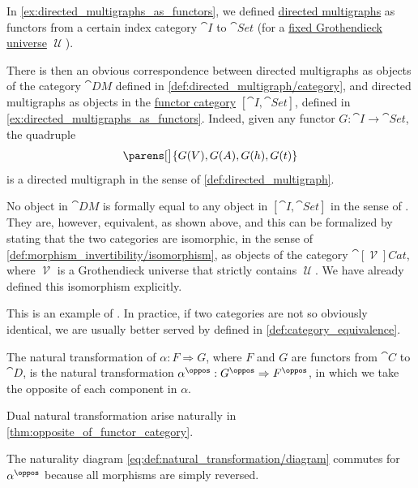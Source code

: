 \begin{example}\label{ex:isomorphism_of_directed_multigraph_categories}
  In \cref{ex:directed_multigraphs_as_functors}, we defined \hyperref[def:directed_multigraph]{directed multigraphs} as functors from a certain index category \( \cat{I} \) to \( \cat{Set} \) (for a \hyperref[def:small_category]{fixed Grothendieck universe} \( \mscrU \)).

  There is then an obvious correspondence between directed multigraphs as objects of the category \( \cat{DM} \) defined in \cref{def:directed_multigraph/category}, and directed multigraphs as objects in the \hyperref[def:functor_category]{functor category} \( [\cat{I}, \cat{Set}] \), defined in \cref{ex:directed_multigraphs_as_functors}. Indeed, given any functor \( G: \cat{I} \to \cat{Set} \), the quadruple
  \begin{equation*}
    \parens[\big]{ G(V), G(A), G(h), G(t) }
  \end{equation*}
  is a directed multigraph in the sense of \cref{def:directed_multigraph}.

  No object in \( \cat{DM} \) is formally equal to any object in \( [\cat{I}, \cat{Set}] \) in the sense of \hyperref[def:zfc]{}. They are, however, equivalent, as shown above, and this can be formalized by stating that the two categories are isomorphic, in the sense of \cref{def:morphism_invertibility/isomorphism}, as objects of the category \( \cat[\mscrV]{Cat} \), where \( \mscrV \) is a Grothendieck universe that strictly contains \( \mscrU \). We have already defined this isomorphism explicitly.

  This is an example of . In practice, if two categories are not so obviously identical, we are usually better served by  defined in \cref{def:category_equivalence}.
\end{example}

\begin{definition}\label{def:opposite_natural_transformation}\mimprovised
  The  natural transformation of \( \alpha: F \Rightarrow G \), where \( F \) and \( G \) are functors from \( \cat{C} \) to \( \cat{D} \), is the natural transformation \( \alpha^\oppos: G^\oppos \Rightarrow F^\oppos \), in which we take the opposite of each component in \( \alpha \).

  Dual natural transformation arise naturally in \cref{thm:opposite_of_functor_category}.
\end{definition}
\begin{defproof}
  The naturality diagram \eqref{eq:def:natural_transformation/diagram} commutes for \( \alpha^\oppos \) because all morphisms are simply reversed.
\end{defproof}

